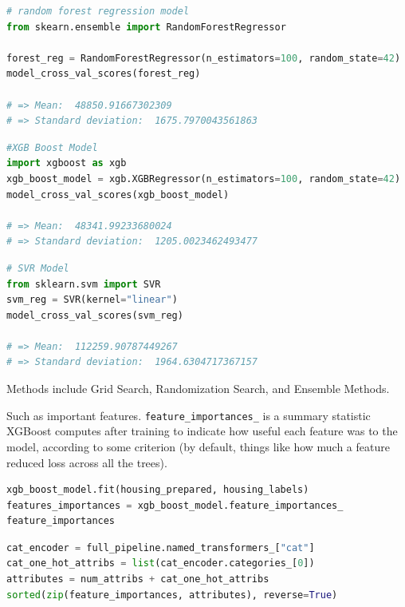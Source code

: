 {\vspace{11pt}
\begin{lstlisting}[language=python, breaklines=true]
# random forest regression model
from skearn.ensemble import RandomForestRegressor

forest_reg = RandomForestRegressor(n_estimators=100, random_state=42)
model_cross_val_scores(forest_reg)

# => Mean:  48850.91667302309
# => Standard deviation:  1675.7970043561863
\end{lstlisting}

\vspace{11pt}
\begin{lstlisting}[language=python, breaklines=true]
#XGB Boost Model
import xgboost as xgb
xgb_boost_model = xgb.XGBRegressor(n_estimators=100, random_state=42)
model_cross_val_scores(xgb_boost_model)

# => Mean:  48341.99233680024
# => Standard deviation:  1205.0023462493477
\end{lstlisting}

\vspace{11pt}
\begin{lstlisting}[language=python, breaklines=true]
# SVR Model
from sklearn.svm import SVR
svm_reg = SVR(kernel="linear")
model_cross_val_scores(svm_reg)

# => Mean:  112259.90787449267
# => Standard deviation:  1964.6304717367157
\end{lstlisting}


Methods include Grid Search, Randomization Search, and Ensemble Methods.


Such as important features. \texttt{feature\_importances\_} is a summary statistic XGBoost computes after training to indicate how useful each feature was to the model, according to some criterion (by default, things like how much a feature reduced loss across all the trees).

\vspace{11pt}
\begin{lstlisting}[language=python, breaklines=true]
xgb_boost_model.fit(housing_prepared, housing_labels)
features_importances = xgb_boost_model.feature_importances_
feature_importances
\end{lstlisting}


\begin{lstlisting}[language=python, breaklines=true]
cat_encoder = full_pipeline.named_transformers_["cat"]
cat_one_hot_attribs = list(cat_encoder.categories_[0])
attributes = num_attribs + cat_one_hot_attribs
sorted(zip(feature_importances, attributes), reverse=True)
\end{lstlisting}

}
